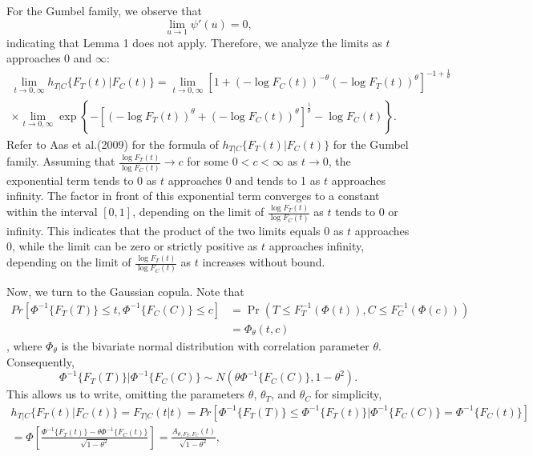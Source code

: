 For the Gumbel family, we observe that 
\[
\lim_{u \to 1} \psi'(u) = 0,
\]
indicating that Lemma 1 does not apply. Therefore, we analyze the limits as \(t\) approaches 0 and \(\infty\):
\begin{align*}
\lim_{t \to 0, \infty} h_{T|C}\{F_T(t) | F_C(t)\} = \lim_{t \to 0, \infty} \left[1 + (-\log F_C(t))^{-\theta} (-\log F_T(t))^{\theta}\right]^{-1 + \frac{1}{\theta}} \\
\times \lim_{t \to 0, \infty} \exp\left\{- \left[ (-\log F_T(t))^{\theta} + (-\log F_C(t))^{\theta} \right]^{ \frac{1}{\theta}} - \log F_C(t)\right\}.
\end{align*}
Refer to Aas et al.(2009)\cite{AAS2009182} for the formula of \(h_{T|C}\{F_T(t) | F_C(t)\}\) for the Gumbel family. Assuming that \(\frac{\log F_T(t)}{\log F_C(t)} \to c\) for some \(0 < c < \infty\) as \(t \to 0\), the exponential term tends to 0 as \(t\) approaches 0 and tends to 1 as \(t\) approaches infinity. The factor in front of this exponential term converges to a constant within the interval \([0, 1]\), depending on the limit of \(\frac{\log F_T(t)}{\log F_C(t)}\) as \(t\) tends to 0 or infinity. This indicates that the product of the two limits equals 0 as \(t\) approaches 0, while the limit can be zero or strictly positive as \(t\) approaches infinity, depending on the limit of \(\frac{\log F_T(t)}{\log F_C(t)}\) as \(t\) increases without bound.

Now, we turn to the Gaussian copula. Note that
\begin{align*}
Pr \left[ \Phi^{-1}\{F_T(T)\} \leq t, \Phi^{-1}\{F_C(C)\} \leq c \right] &= \Pr\left(T \leq F_T^{-1}(\Phi(t)), C \leq F_C^{-1}(\Phi(c))\right)\\
 &= \Phi_{\theta}(t, c)
\end{align*}
, where \(\Phi_{\theta}\) is the bivariate normal distribution with correlation parameter \(\theta\). Consequently, 
\[
\Phi^{-1}\{F_T(T)\} | \Phi^{-1}\{F_C(C)\} \sim N\left(\theta \Phi^{-1}\{F_C(C)\}, 1 - \theta^2\right).
\]
This allows us to write, omitting the parameters \(\theta\), \(\theta_T\), and \(\theta_C\) for simplicity,
\begin{align*}
	h_{T|C}\{F_T(t) | F_C(t)\} = F_{T|C}(t | t) = Pr \left[ \Phi^{-1}\{F_T(T)\} \leq \Phi^{-1}\{F_T(t)\} | \Phi^{-1}\{F_C(C)\} = \Phi^{-1}\{F_C(t)\} \right]\\
= \Phi \left[ \frac{\Phi^{-1}\{F_T(t)\} - \theta \Phi^{-1}\{F_C(t)\}}{\sqrt{1 - \theta^2}} \right] = \frac{A_{\theta, F_T, F_C}(t)}{\sqrt{1 - \theta^2}},
\end{align*}

